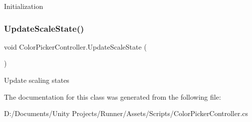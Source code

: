 Initialization \mbox{\label{class_color_picker_controller_a2e9977639f4aeb80cccd6fd972ec8044}} 
\subsubsection{\texorpdfstring{Update\+Scale\+State()}{UpdateScaleState()}}
{\footnotesize\ttfamily void Color\+Picker\+Controller.\+Update\+Scale\+State (\begin{DoxyParamCaption}{ }\end{DoxyParamCaption})\hspace{0.3cm}{\ttfamily [private]}}

Update scaling states 

The documentation for this class was generated from the following file\+:\begin{DoxyCompactItemize}
\item 
D\+:/\+Documents/\+Unity Projects/\+Runner/\+Assets/\+Scripts/Color\+Picker\+Controller.\+cs\end{DoxyCompactItemize}
